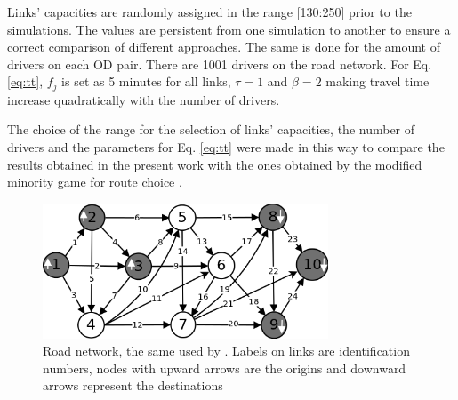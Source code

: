 \documentclass{RITA}
\newcommand{\fftt}{\ensuremath{f_j}} 		%
\begin{document}

Links' capacities are randomly assigned in the range [130:250] prior to the simulations. The values are persistent from one simulation to another to ensure a correct comparison of different approaches. The same is done for the amount of drivers on each OD pair. There are 1001 drivers on the road network. For Eq. \eqref{eq:tt}, $\fftt$ is set as 5 minutes for all links, $\tau = 1$ and $\beta = 2$ making travel time increase quadratically with the number of drivers. 

The choice of the range for the selection of links' capacities, the number of drivers and the parameters for Eq. \eqref{eq:tt} were made in this way to compare the results obtained in the present work with the ones obtained by the modified minority game for route choice \cite{Galib&Moser2011}.


\begin{figure}[ht]
    \centerline{\includegraphics[width=8.5cm]{img/roadnetwork.png}}
    \caption{Road network, the same used by \cite{Galib&Moser2011}. Labels on links are identification numbers, nodes with upward arrows are the origins and downward arrows represent the destinations}
    \label{fig:roadnetwork}
\end{figure}
\end{document}

